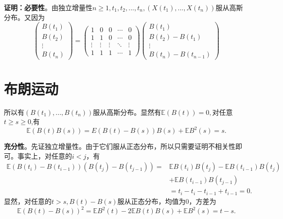 \documentclass[UTF8]{ctexart}
\begin{document}
\textbf{证明：}\textbf{必要性}。由独立增量性$n\ge1,t_1,t_2,...,t_n,(X(t_1),...,X(t_n))$服从高斯分布。又因为
\begin{equation}
\left(\begin{array}{c}B(t_1)\\
                      B(t_2)\\
                      \vdots\\
                      B(t_n)\end{array}\right)=\left(\begin{array}{ccccc}1&0&0&\cdots&0\\
                      1&1&0&\cdots&0\\
                      \vdots&\vdots&\vdots&\ddots&\vdots\\
                      1&1&1&\cdots&1\end{array}\right)\left(\begin{array}{c}B(t_1)\\
                      B(t_2)-B(t_1)\\
                      \vdots\\
                      B(t_n)-B(t_{n-1})\end{array}\right)
\end{equation}


\section{布朗运动}
 所以有$(B(t_1),...,B(t_n))$服从高斯分布。显然有$\mathbb{E}(B(t))=0,$对任意$t\ge s\ge0$,有
 \begin{equation}
 \mathbb{E}(B(t)B(s))=E(B(t)-B(s))B(s)+\mathbb{E}B^2(s)=s.
 \end{equation}

\textbf{充分性}。先证独立增量性。由于它们服从正态分布，所以只需要证明不相关性即可。事实上，对任意的$i<j$，有
\begin{equation}
\begin{split}
\mathbb{E}(B(t_i)-B(t_{i-1}))(B(t_j)-B(t_{j-1}))=&\mathbb{E}B(t_i)B(t_j)-\mathbb{E}B(t_{i-1})B(t_j)\\
                                                 &+\mathbb{E}B(t_{i-1})B(t_{j-1})\\
                                                 &=t_i-t_i-t_{i-1}+t_{i-1}=0.
\end{split}
\end{equation}
显然，对任意的$t>s,B(t)-B(s)$服从正态分布，均值为0，方差为
\begin{equation}
\mathbb{E}(B(t)-B(s))^2=\mathbb{E}B^2(t)-2\mathbb{E}B(t)B(s)+\mathbb{E}B^2(s)=t-s.
\end{equation}
\end{document}
